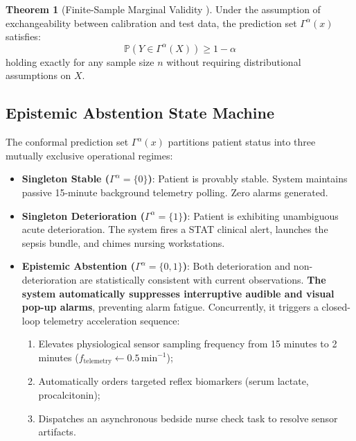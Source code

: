 \documentclass[11pt,a4paper]{article}
\theoremstyle{definition}
\newtheorem{theorem}{Theorem}
\begin{document}
\begin{theorem}[Finite-Sample Marginal Validity \cite{vovk2005algorithmic}]
Under the assumption of exchangeability between calibration and test data, the prediction set $\Gamma^\alpha(x)$ satisfies:
\begin{equation}
\mathbb{P}\left( Y \in \Gamma^\alpha(X) \right) \ge 1 - \alpha
\end{equation}
holding exactly for any sample size $n$ without requiring distributional assumptions on $X$.
\end{theorem}

\subsection{Epistemic Abstention State Machine}
The conformal prediction set $\Gamma^\alpha(x)$ partitions patient status into three mutually exclusive operational regimes:
\begin{itemize}
    \item \textbf{Singleton Stable ($\Gamma^\alpha = \{0\}$)}: Patient is provably stable. System maintains passive 15-minute background telemetry polling. Zero alarms generated.
    \item \textbf{Singleton Deterioration ($\Gamma^\alpha = \{1\}$)}: Patient is exhibiting unambiguous acute deterioration. The system fires a STAT clinical alert, launches the sepsis bundle, and chimes nursing workstations.
    \item \textbf{Epistemic Abstention ($\Gamma^\alpha = \{0, 1\}$)}: Both deterioration and non-deterioration are statistically consistent with current observations. \textbf{The system automatically suppresses interruptive audible and visual pop-up alarms}, preventing alarm fatigue. Concurrently, it triggers a closed-loop telemetry acceleration sequence:
    \begin{enumerate}
        \item Elevates physiological sensor sampling frequency from 15 minutes to 2 minutes ($f_{\text{telemetry}} \gets 0.5\,\text{min}^{-1}$);
        \item Automatically orders targeted reflex biomarkers (serum lactate, procalcitonin);
        \item Dispatches an asynchronous bedside nurse check task to resolve sensor artifacts.
    \end{enumerate}
\end{itemize}
\end{document}
